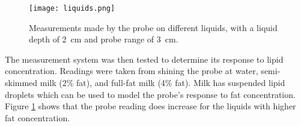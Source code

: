 \begin{figure}[htb]
	\centering
	\texttt{[image: liquids.png]}
	\caption{Measurements made by the probe on different liquids, with a liquid depth of \SI{2}{\centi\metre} and probe range of \SI{3}{\centi\metre}.}
	\label{fig: liquids}
\end{figure}

The measurement system was then tested to determine its response to lipid concentration. Readings were taken from shining the probe at water, semi-skimmed milk (2\% fat), and full-fat milk (4\% fat). Milk has suspended lipid droplets which can be used to model the probe's response to fat concentration. Figure \ref{fig: liquids} shows that the probe reading does increase for the liquids with higher fat concentration.






